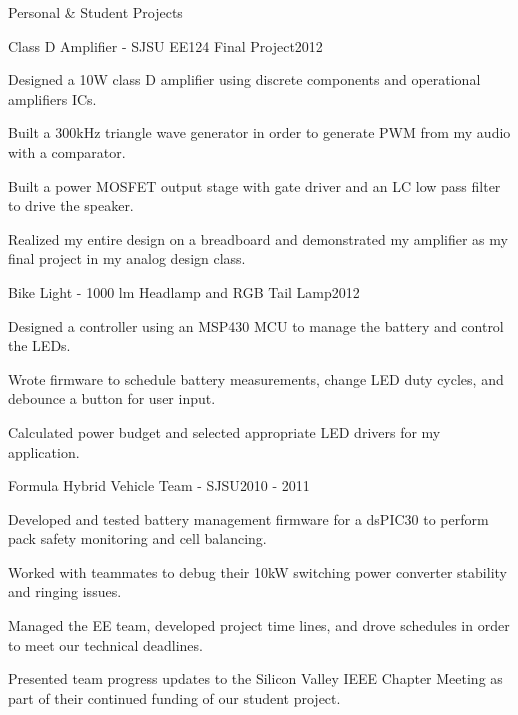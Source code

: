 \documentclass{resume} %
\begin{document}
\pagebreak[3]
\begin{rSection}{Personal \& Student Projects}

\begin{rProject}{Class D Amplifier - SJSU EE124 Final Project}{2012}
\item Designed a 10W class D amplifier using discrete components and operational amplifiers ICs.
\item Built a 300kHz triangle wave generator in order to generate PWM from my audio with a comparator.
\item Built a power MOSFET output stage with gate driver and an LC low pass filter to drive the speaker.
\item Realized my entire design on a breadboard and demonstrated my amplifier as my final project in my analog design class.
\end{rProject}

\begin{rProject}{Bike Light - 1000 lm Headlamp and RGB Tail Lamp}{2012}
\item Designed a controller using an MSP430 MCU to manage the battery and control the LEDs.
\item Wrote firmware to schedule battery measurements, change LED duty cycles, and debounce a button for user input. 
\item Calculated power budget and selected appropriate LED drivers for my application.
\end{rProject}

\begin{rProject}{Formula Hybrid Vehicle Team - SJSU}{2010 - 2011}
\item Developed and tested battery management firmware for a dsPIC30 to perform pack safety monitoring and cell balancing.
\item Worked with teammates to debug their 10kW switching power converter stability and ringing issues.
\item Managed the EE team, developed project time lines, and drove schedules in order to meet our technical deadlines.
\item Presented team progress updates to the Silicon Valley IEEE Chapter Meeting as part of their continued funding of our student project.
\end{rProject}
\end{rSection}
\end{document}
